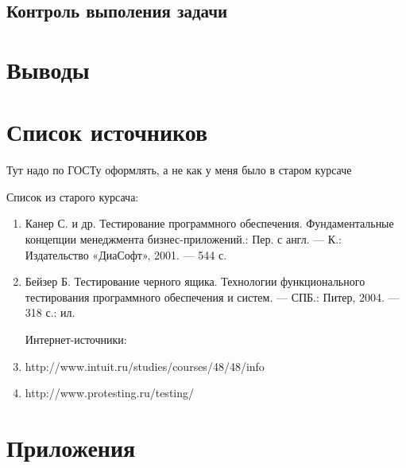 \documentclass[a4paper,12pt]{article}
\begin{document}
\subsection{Контроль выполения задачи}

\newpage\section*{Выводы}

\newpage\section*{Список источников}
Тут надо по ГОСТу оформлять, а не как у меня было в старом курсаче

Список из старого курсача:
\begin{enumerate}
\item Канер С.  и др. Тестирование  программного  обеспечения.  Фундаментальные  концепции  
менеджмента бизнес-приложений.:  Пер.  с англ.  —  К.:  Издательство  «ДиаСофт»,  2001.  —  544  с.  
\item Бейзер Б. Тестирование черного ящика. Технологии функционального тестирования программного обеспечения и систем.  —  СПБ.: Питер, 2004.  —  318 с.: ил.
\par Интернет-источники:
\item http://www.intuit.ru/studies/courses/48/48/info
\item http://www.protesting.ru/testing/
\end{enumerate}


\newpage\section*{Приложения}
\end{document}
